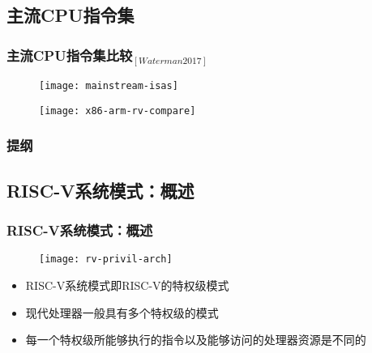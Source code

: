 \subsection{主流CPU指令集}
\begin{frame}
	
	\frametitle{{主流CPU指令集比较$ _{[Waterman 2017]} $}}
	
	\begin{figure}
		\centering
		\texttt{[image: mainstream-isas]}
	\end{figure}
	\pause
	
	\begin{figure}
		\centering
		\texttt{[image: x86-arm-rv-compare]}
	\end{figure}
	
	
	
	
\end{frame}


\begin{frame}
    \frametitle{提纲} 
    \tableofcontents 
\end{frame}

\subsection{RISC-V系统模式：概述}
\begin{frame}
    \frametitle{RISC-V系统模式：\small{概述}}
    
    \begin{figure}
        \centering
        \texttt{[image: rv-privil-arch]}
    \end{figure}
    
    \begin{itemize}
        
        \item RISC-V系统模式即RISC-V的特权级模式
        \item 现代处理器一般具有多个特权级的模式
        \item 每一个特权级所能够执行的指令以及能够访问的处理器资源是不同的
        
    \end{itemize}
    
\end{frame}

